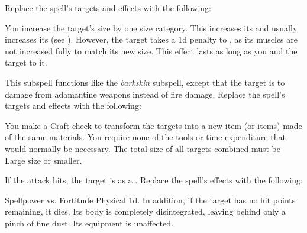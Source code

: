 Replace the spell's targets and effects with the following:
\begin{spellcontent}
\begin{augmenttargetinginfo}
\end{augmenttargetinginfo}
\begin{augmenteffects}
\spelleffect
You increase the target's size by one size category.
This increases its  and usually increases its  (see ).
However, the target takes a \minus1d penalty to , as its muscles are not increased fully to match its new size.
This effect lasts as long as you and the target  to it.
\end{augmenteffects}
\end{spellcontent}
This subspell functions like the \textit{barkskin} subspell, except that the target is  to damage from adamantine weapons instead of fire damage.
Replace the spell's targets and effects with the following:
\begin{spellcontent}
\begin{augmenttargetinginfo}
\end{augmenttargetinginfo}
\begin{augmenteffects}
\spelleffect
You make a Craft check to transform the targets into a new item (or items) made of the same materials.
You require none of the tools or time expenditure that would normally be necessary.
The total size of all targets combined must be Large size or smaller.
\end{augmenteffects}
\end{spellcontent}
If the attack hits, the target is  as a .
Replace the spell's effects with the following:
\begin{spellcontent}
\begin{augmenteffects}
\begin{spellattack}{Spellpower vs. Fortitude}
\spellsuccess
Physical  \plus1d.
In addition, if the target has no hit points remaining, it dies.
Its body is completely disintegrated, leaving behind only a pinch of fine dust.
Its equipment is unaffected.
\end{spellattack}
\end{augmenteffects}
\end{spellcontent}
